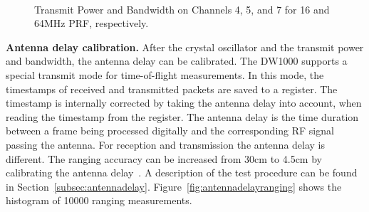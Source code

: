 \documentclass[journal,comsoc]{IEEEtran}
\begin{document}
\begin{figure}
{		\label{fig:TEST9_CH5_16M}}
	\hfil
		\\
	\hfil
	\caption{Transmit Power and Bandwidth on Channels 4, 5, and 7 for 16 and 64MHz PRF, respectively.}
	\label{fig:txpowermeasurements457}
\end{figure}



\vspace*{0.5em}
\noindent\textbf{Antenna delay calibration.} After the crystal oscillator and the transmit power and bandwidth, the antenna delay can be calibrated.
The DW1000 supports a special transmit mode for time-of-flight measurements.
In this mode, the timestamps of received and transmitted packets are saved to a register.
The timestamp is internally corrected by taking the antenna delay into account, when reading the timestamp from the register.
The antenna delay is the time duration between a frame being processed digitally and the corresponding RF signal passing the antenna.
For reception and transmission the antenna delay is different.
The ranging accuracy can be increased from 30cm to 4.5cm by calibrating the antenna delay~\cite{dw1000antdelcal}.
A description of the test procedure can be found in Section~\ref{subsec:antennadelay}.
Figure~\ref{fig:antennadelayranging} shows the histogram of 10000 ranging measurements.
\end{document}
